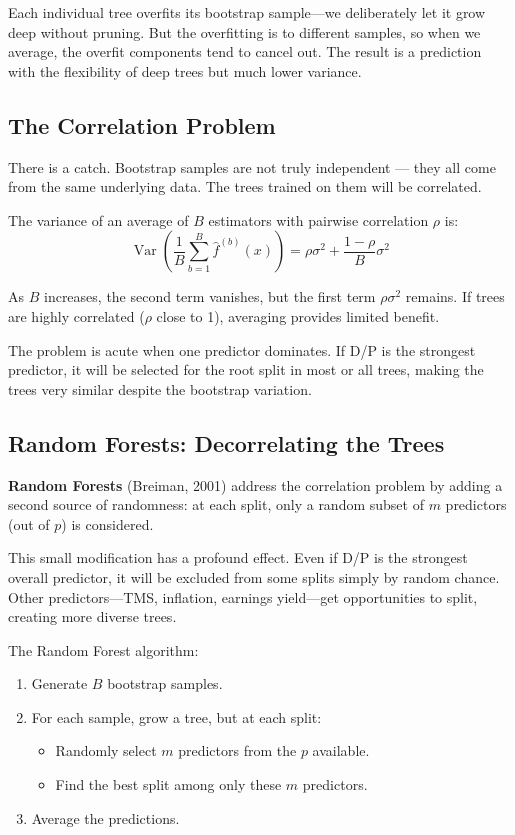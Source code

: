 \documentclass[11pt,a4paper]{article}
\DeclareMathOperator{\Var}{Var}
\newcommand{\keyword}[1]{\textbf{\textcolor{AccentOrange}{#1}}}
\begin{document}
Each individual tree overfits its bootstrap sample---we deliberately let it grow deep without pruning. But the overfitting is to different samples, so when we average, the overfit components tend to cancel out. The result is a prediction with the flexibility of deep trees but much lower variance.

\subsection{The Correlation Problem}

There is a catch. Bootstrap samples are not truly independent — they all come from the same underlying data. The trees trained on them will be correlated.

The variance of an average of $B$ estimators with pairwise correlation $\rho$ is:
\[
\Var\left(\frac{1}{B}\sum_{b=1}^{B} \widehat{f}^{(b)}(x)\right) = \rho\sigma^2 + \frac{1-\rho}{B}\sigma^2
\]

As $B$ increases, the second term vanishes, but the first term $\rho\sigma^2$ remains. If trees are highly correlated ($\rho$ close to 1), averaging provides limited benefit.

The problem is acute when one predictor dominates. If D/P is the strongest predictor, it will be selected for the root split in most or all trees, making the trees very similar despite the bootstrap variation.

\subsection{Random Forests: Decorrelating the Trees}

\keyword{Random Forests} (Breiman, 2001) address the correlation problem by adding a second source of randomness: at each split, only a random subset of $m$ predictors (out of $p$) is considered.

This small modification has a profound effect. Even if D/P is the strongest overall predictor, it will be excluded from some splits simply by random chance. Other predictors---TMS, inflation, earnings yield---get opportunities to split, creating more diverse trees.

The Random Forest algorithm:
\begin{enumerate}
    \item Generate $B$ bootstrap samples.
    \item For each sample, grow a tree, but at each split:
    \begin{itemize}
        \item Randomly select $m$ predictors from the $p$ available.
        \item Find the best split among only these $m$ predictors.
    \end{itemize}
    \item Average the predictions.
\end{enumerate}
\end{document}
